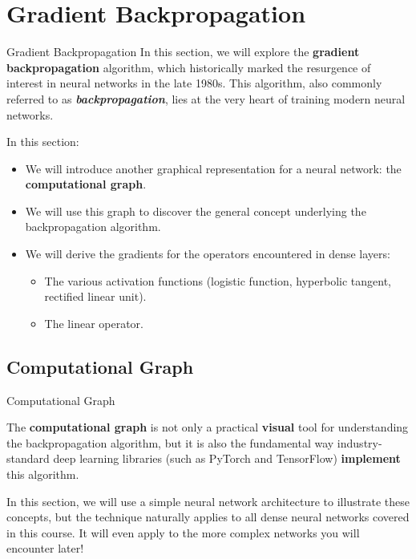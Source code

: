\section[Gradient Backpropagation]{Gradient Backpropagation}

\begin{frame}{Gradient Backpropagation}
	In this section, we will explore the \textbf{gradient backpropagation} algorithm, which historically marked the resurgence of interest in neural networks in the late 1980s. This algorithm, also commonly referred to as \textit{\textbf{backpropagation}}, lies at the very heart of training modern neural networks.
	
	\pause
	\vspace{0.3cm}
	
	In this section:
	\begin{itemize}
		\item We will introduce another graphical representation for a neural network: the \textbf{computational graph}.
		\pause
		\item We will use this graph to discover the general concept underlying the backpropagation algorithm.
		\pause
		\item We will derive the gradients for the operators encountered in dense layers:
		\begin{itemize}
			\item The various activation functions (logistic function, hyperbolic tangent, rectified linear unit).
			\item The linear operator.
		\end{itemize}
	\end{itemize}
\end{frame}

\subsection[Computational Graph]{Computational Graph}

\begin{frame}{Computational Graph}
	
	The \textbf{computational graph} is not only a practical \textbf{visual} tool for understanding the backpropagation algorithm, but it is also the fundamental way industry-standard deep learning libraries (such as PyTorch and TensorFlow) \textbf{implement} this algorithm.
	
	\pause
	\vspace{0.3cm}
	
	In this section, we will use a simple neural network architecture to illustrate these concepts, but the technique naturally applies to all dense neural networks covered in this course. It will even apply to the more complex networks you will encounter later!
	
\end{frame}

